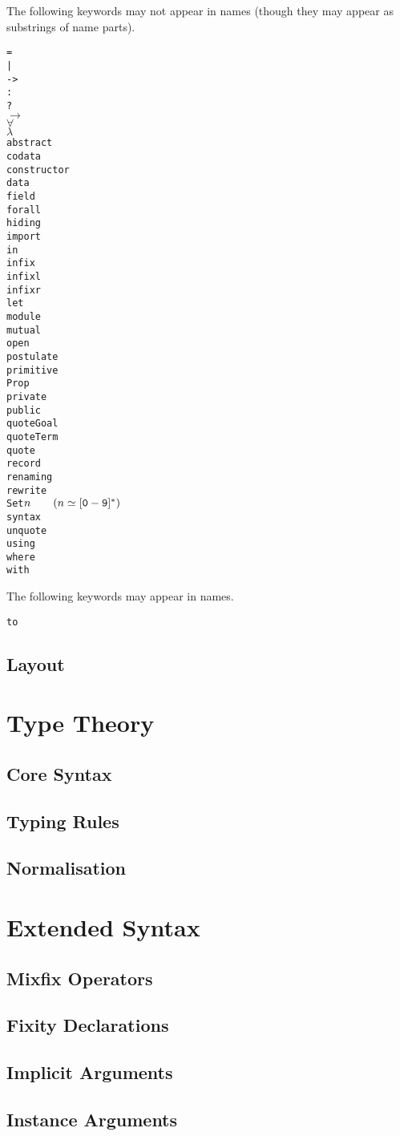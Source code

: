 \documentclass{article}
\begin{document}
The following keywords may not appear in names (though they may appear as substrings of name parts).
\begin{multicols}{3}
\begin{alltt}
=
|
->
:
?
\(\to\)
\(\forall\)
\(\lambda\)
abstract
codata
constructor
data
field
forall
hiding
import
in
infix
infixl
infixr
let
module
mutual
open
postulate
primitive
Prop
private
public
quoteGoal
quoteTerm
quote
record
renaming
rewrite
Set\(n\qquad(n\simeq\mathtt{[0-9]\sp{*}})\)
syntax
unquote
using
where
with
\end{alltt}
\end{multicols}
The following keywords may appear in names.
\begin{alltt}
to
\end{alltt}
\subsection{Layout}
\label{sec:layout}
\section{Type Theory}
\subsection{Core Syntax}
\subsection{Typing Rules}
\subsection{Normalisation}
\section{Extended Syntax}
\subsection{Mixfix Operators}
\subsection{Fixity Declarations}
\subsection{Implicit Arguments}
\subsection{Instance Arguments}
\end{document}
